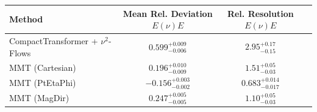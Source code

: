     \begin{tabular}{lccc}
        \toprule
        Method & Mean Rel. Deviation $E(\nu)E$ & Rel. Resolution $E(\nu)E$ \\
        \midrule
        CompactTransformer + $\nu^2$-Flows & $0.599^{+0.009}_{-0.006}$ & $2.95^{+0.17}_{-0.15}$ \\
        MMT (Cartesian) & $0.196^{+0.010}_{-0.009}$ & $1.51^{+0.05}_{-0.03}$ \\
        MMT (PtEtaPhi) & $-0.156^{+0.003}_{-0.002}$ & $0.683^{+0.014}_{-0.017}$ \\
        MMT (MagDir) & $0.247^{+0.005}_{-0.005}$ & $1.10^{+0.05}_{-0.03}$ \\
        \bottomrule
    \end{tabular}